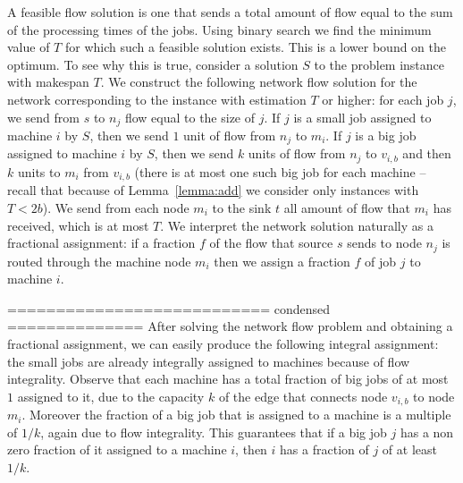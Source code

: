 \documentclass[11pt]{article}\usepackage{amsmath}
\begin{document}
A feasible flow solution is one that sends a 
total amount of flow  equal to the  sum of the
processing times of the jobs. Using binary search we find the minimum
value of $T$ for which such a feasible solution exists. 
This is a lower bound on the optimum. To see why this is true,
consider a solution $S$ to the problem instance with makespan $T$. We
construct the following network flow solution for the network
corresponding to the instance with estimation $T$ or higher: for each job $j$,
we send from $s$ to $n_j$ flow equal to the size of $j$. If $j$ is a
small job assigned to machine $i$ by $S$, then we send $1$ unit of
flow from $n_j$ to $m_i$. If $j$ is a big job assigned to machine $i$
by $S$, then we send $k$ units of flow from $n_j$ to $v_{i,b}$ and
then $k$ units to $m_i$ from $v_{i,b}$ (there is at most one such big
job for each machine -- recall that because of  Lemma~\ref{lemma:add} we consider only instances with $T< 2b$). We send from each node $m_i$ to the sink $t$ all amount of flow that $m_i$ has received, which is at most $T$.
 We
interpret the  network solution naturally as  a fractional assignment:
if a fraction $f$  of the flow that source $s$ sends  to node $n_j$ is
routed through the machine node $m_i$ then we assign a fraction $f$ of
job $j$ to machine $i$.
 
\iffalse    ==== We  are only  interested in  instances of  the problem  for  which the
network  has a  feasible solution  for  some value  of the  parameter
$T$. If an instance has no feasible solution for any value of $T$, it
 it is necessary to have at least 2 big jobs scheduled
on  the same  machine. Obtaining  a  $3/2$ approximation  for such  an
instance is trivial via the rounding technique of \cite{lenstra}.
\fi 



\iffalse =========================== condensed ==============
After  solving the  network flow  problem and  obtaining  a fractional
assignment, we  can easily produce the  following integral assignment:
the small jobs are already  integrally assigned to machines because of
flow integrality.  Observe that each  machine has a total  fraction of
big jobs of at most $1$ assigned to it, due to the capacity $k$ of the
edge that connects node $v_{i,b}$ to node $m_i$. Moreover the fraction
of a  big job that is  assigned to a  machine is a multiple  of $1/k$,
again due to  flow integrality. This guarantees that if  a big job $j$
has a non zero fraction of it  assigned to a machine $i$, then $i$ has
a fraction of $j$ of at least $1/k$.
\end{document}
